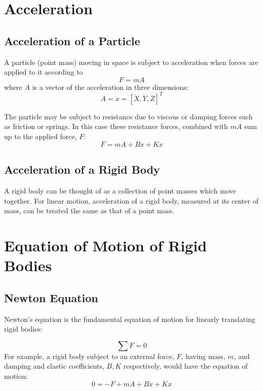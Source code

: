 \section{Acceleration}

\subsection{Acceleration of a Particle}

A particle (point mass) moving in space is subject to acceleration when forces are applied to it according to
\[
F = m A
\]
where $A$ is a vector of the acceleration in three dimensions:
\[
A = \ddot{x} = [\ddot{X}, \ddot{Y}, \ddot{Z}]^T
\]

The particle may be subject to resistance due to viscous or damping forces such as friction or springs.   In this case these resistance forces, combined with $mA$ sum up to the applied force, $F$:
\[
F = mA + B\dot{x} + Kx
\]



\subsection{Acceleration of a Rigid Body}

A rigid body can be thought of as a collection of point masses which move together.
For linear motion, acceleration of a rigid body, measured at its center of mass, can be treated the same as that of a point mass.





\section{Equation of Motion of Rigid Bodies}
\subsection{Newton Equation}

Newton's equation is the fundamental equation of motion for linearly translating rigid bodies:

\[
\sum F = 0
\]
For example, a rigid body subject to an external force, $F$, having mass, $m$, and damping and elastic coefficients, $B, K$ respectively, would
have the equation of motion:
\[
0 = -F + mA + B\dot{x} + Kx
\]

